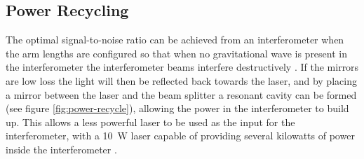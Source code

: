 \subsection{Power Recycling}
\label{sec:power-recycling}
%
%
The optimal signal-to-noise ratio can be achieved from an
interferometer when the arm lengths are configured so that when no
gravitational wave is present in the interferometer the interferometer
beams interfere destructively \cite{1978JPhE...11..710E}. If the
mirrors are low loss the light will then be reflected back towards the
laser, and by placing a mirror between the laser and the beam splitter
a resonant cavity can be formed (see figure \ref{fig:power-recycle}),
allowing the power in the interferometer to build up. This allows a
less powerful laser to be used as the input for the interferometer,
with a \SI{10}{\watt} laser capable of providing several kilowatts of
power inside the interferometer \cite{2011LRR....14....5P}.

